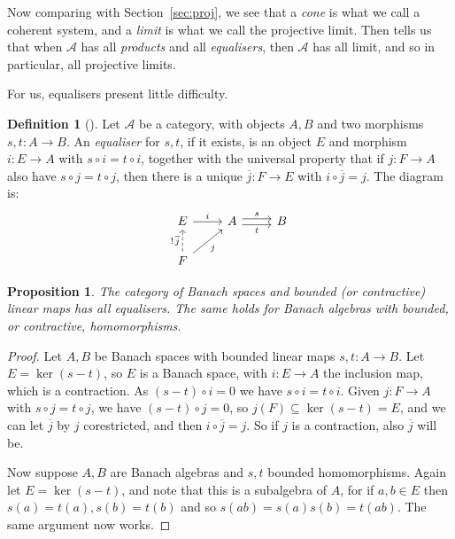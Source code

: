 \documentclass[a4paper,11pt]{article}
\newcommand{\mc}[1]{{\mathcal{#1}}}
\newtheorem{proposition}[lemma]{Proposition}
\theoremstyle{definition}
\newtheorem{definition}[lemma]{Definition}
\begin{document}
Now comparing \cite[Definition~5.1.19]{leinster} with Section~\ref{sec:proj}, we see that a \emph{cone} is what we call a coherent system, and a \emph{limit} is what we call the projective limit.  Then \cite[Proposition~5.1.26]{leinster} tells us that when $\mc A$ has all \emph{products} and all \emph{equalisers}, then $\mc A$ has all limit, and so in particular, all projective limits.

For us, equalisers present little difficulty.

\begin{definition}[{\cite[Definition~5.1.11]{leinster}}]
Let $\mc A$ be a category, with objects $A,B$ and two morphisms $s,t\colon A \to B$.  An \emph{equaliser} for $s, t$, if it exists, is an object $E$ and morphism $i\colon E \to A$ with $s\circ i = t\circ i$, together with the universal property that if $j\colon F \to A$ also have $s\circ j=t\circ j$, then there is a unique $\overline j \colon F\to E$ with $i\circ\overline j = j$.  The diagram is:
\[\begin{tikzcd}
E \arrow[r, "i"] & A \arrow[r,shift left, "s"] \arrow[r, shift right, "t"'] & B  \\
F \arrow[ru, "j"'] \arrow[u, dashed, "!\, \overline j"]
\end{tikzcd}\]
\end{definition}

\begin{proposition}
The category of Banach spaces and bounded (or contractive) linear maps has all equalisers.  The same holds for Banach algebras with bounded, or contractive, homomorphisms.
\end{proposition}
\begin{proof}
Let $A,B$ be Banach spaces with bounded linear maps $s,t\colon A\to B$.  Let $E = \ker(s-t)$, so $E$ is a Banach space, with $i\colon E\to A$ the inclusion map, which is a contraction.  As $(s-t)\circ i=0$ we have $s\circ i=t\circ i$.  Given $j\colon F \to A$ with $s\circ j=t\circ j$, we have $(s-t)\circ j=0$, so $j(F) \subseteq \ker(s-t) = E$, and we can let $\overline j$ by $j$ corestricted, and then $i\circ\overline j=j$.  So if $j$ is a contraction, also $\overline j$ will be.

Now suppose $A, B$ are Banach algebras and $s,t$ bounded homomorphisms.  Again let $E=\ker(s-t)$, and note that this is a subalgebra of $A$, for if $a,b\in E$ then $s(a)=t(a), s(b)=t(b)$ and so $s(ab) =s(a)s(b)= t(ab)$.  The same argument now works.
\end{proof}
\end{document}
